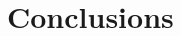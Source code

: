 \documentclass[runningheads]{llncs}
\begin{document}
\small 

\section{Conclusions}

%
%
%
% 
% 
%
\begin{thebibliography}{8}




\end{thebibliography}
\end{document}
